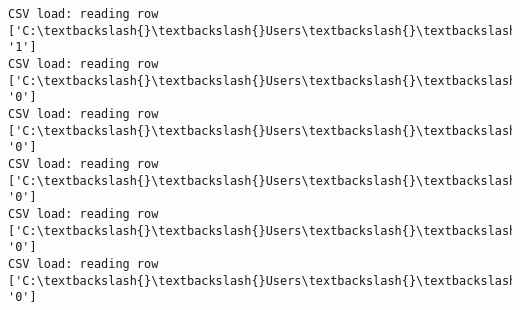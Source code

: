 \documentclass[11pt]{article}
\begin{document}
\begin{Verbatim}[commandchars=\\\{\}]
CSV load: reading row ['C:\textbackslash{}\textbackslash{}Users\textbackslash{}\textbackslash{}AbhishekGangadhar\textbackslash{}\textbackslash{}Downloads\textbackslash{}\textbackslash{}ActionRecog\textbackslash{}\textbackslash{}ActionRecog\textbackslash{}\textbackslash{}DataSets\textbackslash{}\textbackslash{}UCF11\textbackslash{}\textbackslash{}action\_youtube\_naudio\textbackslash{}\textbackslash{}golf\_swing\textbackslash{}\textbackslash{}v\_golf\_10\textbackslash{}\textbackslash{}v\_golf\_10\_04.avi', '1']
CSV load: reading row ['C:\textbackslash{}\textbackslash{}Users\textbackslash{}\textbackslash{}AbhishekGangadhar\textbackslash{}\textbackslash{}Downloads\textbackslash{}\textbackslash{}ActionRecog\textbackslash{}\textbackslash{}ActionRecog\textbackslash{}\textbackslash{}DataSets\textbackslash{}\textbackslash{}UCF11\textbackslash{}\textbackslash{}action\_youtube\_naudio\textbackslash{}\textbackslash{}biking\textbackslash{}\textbackslash{}v\_biking\_08\textbackslash{}\textbackslash{}v\_biking\_08\_01.avi', '0']
CSV load: reading row ['C:\textbackslash{}\textbackslash{}Users\textbackslash{}\textbackslash{}AbhishekGangadhar\textbackslash{}\textbackslash{}Downloads\textbackslash{}\textbackslash{}ActionRecog\textbackslash{}\textbackslash{}ActionRecog\textbackslash{}\textbackslash{}DataSets\textbackslash{}\textbackslash{}UCF11\textbackslash{}\textbackslash{}action\_youtube\_naudio\textbackslash{}\textbackslash{}biking\textbackslash{}\textbackslash{}v\_biking\_08\textbackslash{}\textbackslash{}v\_biking\_08\_02.avi', '0']
CSV load: reading row ['C:\textbackslash{}\textbackslash{}Users\textbackslash{}\textbackslash{}AbhishekGangadhar\textbackslash{}\textbackslash{}Downloads\textbackslash{}\textbackslash{}ActionRecog\textbackslash{}\textbackslash{}ActionRecog\textbackslash{}\textbackslash{}DataSets\textbackslash{}\textbackslash{}UCF11\textbackslash{}\textbackslash{}action\_youtube\_naudio\textbackslash{}\textbackslash{}biking\textbackslash{}\textbackslash{}v\_biking\_08\textbackslash{}\textbackslash{}v\_biking\_08\_03.avi', '0']
CSV load: reading row ['C:\textbackslash{}\textbackslash{}Users\textbackslash{}\textbackslash{}AbhishekGangadhar\textbackslash{}\textbackslash{}Downloads\textbackslash{}\textbackslash{}ActionRecog\textbackslash{}\textbackslash{}ActionRecog\textbackslash{}\textbackslash{}DataSets\textbackslash{}\textbackslash{}UCF11\textbackslash{}\textbackslash{}action\_youtube\_naudio\textbackslash{}\textbackslash{}biking\textbackslash{}\textbackslash{}v\_biking\_08\textbackslash{}\textbackslash{}v\_biking\_08\_04.avi', '0']
CSV load: reading row ['C:\textbackslash{}\textbackslash{}Users\textbackslash{}\textbackslash{}AbhishekGangadhar\textbackslash{}\textbackslash{}Downloads\textbackslash{}\textbackslash{}ActionRecog\textbackslash{}\textbackslash{}ActionRecog\textbackslash{}\textbackslash{}DataSets\textbackslash{}\textbackslash{}UCF11\textbackslash{}\textbackslash{}action\_youtube\_naudio\textbackslash{}\textbackslash{}biking\textbackslash{}\textbackslash{}v\_biking\_08\textbackslash{}\textbackslash{}v\_biking\_08\_05.avi', '0']

\end{Verbatim}
\end{document}
